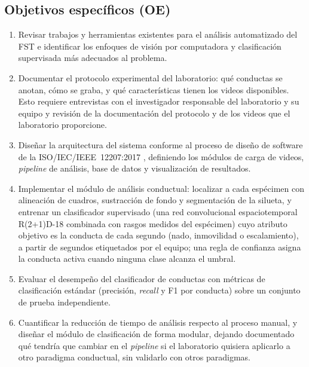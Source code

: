\subsection{Objetivos específicos (OE)}
\begin{enumerate}[label=\textbf{OE-\arabic*.}, leftmargin=*, labelwidth=1.6cm, labelsep=0.4cm, align=left]
  \item Revisar trabajos y herramientas existentes para el análisis automatizado del
        FST e identificar los enfoques de visión por computadora y clasificación
        supervisada más adecuados al problema.
  \item Documentar el protocolo experimental del laboratorio: qué conductas se anotan,
        cómo se graba, y qué características tienen los videos disponibles. Esto
        requiere entrevistas con el investigador responsable del laboratorio y su equipo y revisión de la documentación
        del protocolo y de los videos que el laboratorio proporcione.
  \item Diseñar la arquitectura del sistema conforme al proceso de diseño de software
        de la ISO/IEC/IEEE~12207:2017 \cite{iso12207}, definiendo los módulos de carga
        de videos, \textit{pipeline} de análisis, base de datos y visualización de resultados.
  \item Implementar el módulo de análisis conductual: localizar a cada espécimen con
        alineación de cuadros, sustracción de fondo y segmentación de la silueta, y
        entrenar un clasificador supervisado (una red convolucional espaciotemporal
        R(2+1)D-18 combinada con rasgos medidos del espécimen) cuyo atributo objetivo
        es la conducta de cada segundo (nado, inmovilidad o escalamiento), a partir de
        segundos etiquetados por el equipo; una regla de confianza asigna la conducta
        activa cuando ninguna clase alcanza el umbral.
  \item Evaluar el desempeño del clasificador de conductas con métricas de
        clasificación estándar (precisión, \textit{recall} y F1 por conducta) sobre un
        conjunto de prueba independiente.
  \item Cuantificar la reducción de tiempo de análisis respecto al proceso manual, y
        diseñar el módulo de clasificación de forma modular, dejando documentado qué
        tendría que cambiar en el \textit{pipeline} si el laboratorio quisiera aplicarlo
        a otro paradigma conductual, sin validarlo con otros paradigmas.
\end{enumerate}

